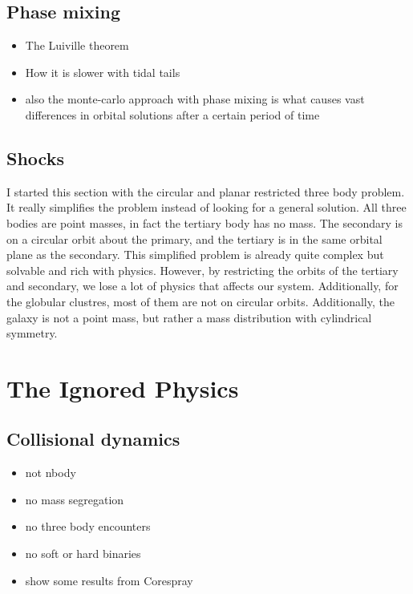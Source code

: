     \subsection{Phase mixing}
        \begin{itemize}
            \item The Luiville theorem
            \item How it is slower with tidal tails 
            \item also the monte-carlo approach with phase mixing is what causes vast differences in orbital solutions after a certain period of time 
        \end{itemize}
    
    \subsection{Shocks}
        I started this section with the circular and planar restricted three body problem. It really simplifies the problem instead of looking for a general solution. All three bodies are point masses, in fact the tertiary body has no mass. The secondary is on a circular orbit about the primary, and the tertiary is in the same orbital plane as the secondary. This simplified problem is already quite complex but solvable and rich with physics. However, by restricting the orbits of the tertiary and secondary, we lose a lot of physics that affects our system. Additionally, for the globular clustres, most of them are not on circular orbits. Additionally, the galaxy is not a point mass, but rather a mass distribution with cylindrical symmetry.        



\section{The Ignored Physics}
    \subsection{Collisional dynamics}
        \begin{itemize}
            \item not nbody
            \item no mass segregation
            \item no three body encounters 
            \item no soft or hard binaries 
            \item show some results from Corespray 
        \end{itemize}
    
